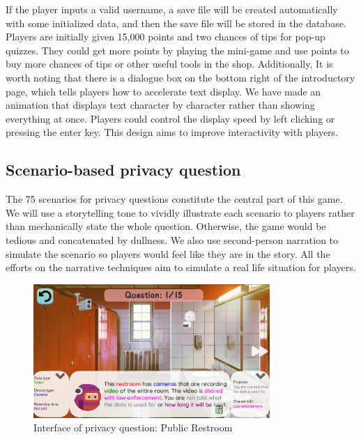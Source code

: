 \documentclass[msc,deptreport,ai]{infthesis}      %
\begin{document}
If the player inputs a valid username, a save file will be created automatically with some initialized data, and then the save file will be stored in the database. Players are initially given 15,000 points and two chances of tips for pop-up quizzes. They could get more points by playing the mini-game and use points to buy more chances of tips or other useful tools in the shop. Additionally, It is worth noting that there is a dialogue box on the bottom right of the introductory page, which tells players how to accelerate text display. We have made an animation that displays text character by character rather than showing everything at once. Players could control the display speed by left clicking or pressing the enter key. This design aims to improve interactivity with players.

\subsection{Scenario-based privacy question}

The 75 scenarios for privacy questions constitute the central part of this game. We will use a storytelling tone to vividly illustrate each scenario to players rather than mechanically state the whole question. Otherwise, the game would be tedious and concatenated by dullness. We also use second-person narration to simulate the scenario so players would feel like they are in the story.  All the efforts on the narrative techniques aim to simulate a real life situation for players.

\begin{figure}
    \centering
    \includegraphics[width=0.8\textwidth]{Interface.png}
    \caption{Interface of privacy question: Public Restroom}
    \label{fig:interface}
\end{figure}
\end{document}
